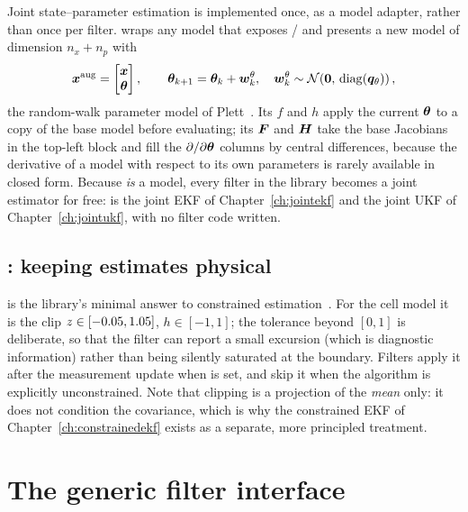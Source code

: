 Joint state--parameter estimation is implemented once, as a model adapter, rather than once per
filter.  wraps any model that exposes / and
presents a new model of dimension $n_x + n_p$ with
\begin{equation}
\bm{x}^{\text{aug}} = \begin{bmatrix}\bm{x}\\ \bm{\theta}\end{bmatrix},\qquad
\bm{\theta}_{k+1} = \bm{\theta}_k + \bm{w}^\theta_k,\quad \bm{w}^\theta_k\sim\mathcal{N}\!\left(\bm 0,\,\operatorname{diag}(\bm q_\theta)\right),
\label{eq:lib-aug}
\end{equation}
the random-walk parameter model of Plett~\cite{plett2004ekf3}. Its $f$ and $h$ apply the current
$\bm{\theta}$ to a copy of the base model before evaluating; its $\bm{F}$ and $\bm{H}$ take the base
Jacobians in the top-left block and fill the $\partial/\partial\bm{\theta}$ columns by central
differences, because the derivative of a model with respect to its own parameters is rarely
available in closed form. Because  \emph{is} a model, every filter in the
library becomes a joint estimator for free:  is the joint EKF of
Chapter~\ref{ch:jointekf} and  the joint UKF of
Chapter~\ref{ch:jointukf}, with no filter code written.

\subsection{: keeping estimates physical}

 is the library's minimal answer to constrained estimation~\cite{simon2010constraints}.
For the cell model it is the clip $z\in[-0.05,1.05]$, $h\in[-1,1]$; the tolerance beyond
$[0,1]$ is deliberate, so that the filter can report a small excursion (which is diagnostic
information) rather than being silently saturated at the boundary. Filters apply it after the
measurement update when  is set, and skip it when the algorithm is
explicitly unconstrained. Note that clipping is a projection of the \emph{mean} only: it does not
condition the covariance, which is why the constrained EKF of Chapter~\ref{ch:constrainedekf}
exists as a separate, more principled treatment.

\section{The generic filter interface}
\label{sec:lib-filter}

